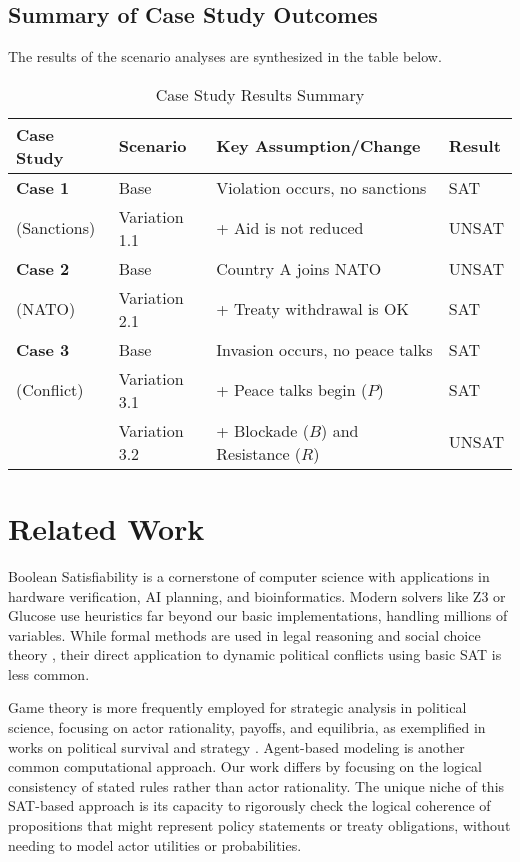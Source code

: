 \documentclass[11pt, a4paper]{article}
\begin{document}
\subsection*{Summary of Case Study Outcomes}
The results of the scenario analyses are synthesized in the table below.

\begin{table}[h!]
\centering
\caption{Case Study Results Summary}
\label{tab:results_summary}
\begin{tabular}{@{}llll@{}}
\toprule
\textbf{Case Study} & \textbf{Scenario} & \textbf{Key Assumption/Change} & \textbf{Result} \\ \midrule
\textbf{Case 1} & Base & Violation occurs, no sanctions & SAT \\
(Sanctions) & Variation 1.1 & + Aid is not reduced & UNSAT \\ \midrule
\textbf{Case 2} & Base & Country A joins NATO & UNSAT \\
(NATO) & Variation 2.1 & + Treaty withdrawal is OK & SAT \\ \midrule
\textbf{Case 3} & Base & Invasion occurs, no peace talks & SAT \\
(Conflict) & Variation 3.1 & + Peace talks begin ($P$) & SAT \\
& Variation 3.2 & + Blockade ($B$) and Resistance ($R$) & UNSAT \\ \bottomrule
\end{tabular}
\end{table}

\section{Related Work} \label{sec:relatedwork}

Boolean Satisfiability is a cornerstone of computer science with applications in hardware verification, AI planning, and bioinformatics. Modern solvers like Z3 or Glucose use heuristics far beyond our basic implementations, handling millions of variables. While formal methods are used in legal reasoning and social choice theory \cite{Gehlbach2013}, their direct application to dynamic political conflicts using basic SAT is less common.

Game theory is more frequently employed for strategic analysis in political science, focusing on actor rationality, payoffs, and equilibria, as exemplified in works on political survival and strategy \cite{BuenoDeMesquita2003}. Agent-based modeling is another common computational approach. Our work differs by focusing on the logical consistency of stated rules rather than actor rationality. The unique niche of this SAT-based approach is its capacity to rigorously check the logical coherence of propositions that might represent policy statements or treaty obligations, without needing to model actor utilities or probabilities.
\end{document}

